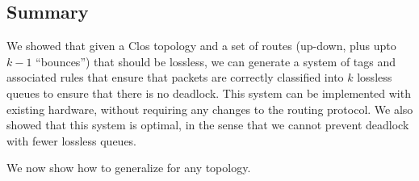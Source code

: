 \subsection {Summary}

We showed that given a Clos topology and a set of routes (up-down, plus
upto $k-1$ ``bounces'') that should be lossless, we can generate a system of
tags and associated rules that ensure that packets are correctly classified
into $k$ lossless queues to ensure that there is no deadlock.   This system can
be implemented with existing hardware, without requiring any changes to the
routing protocol. We also showed that this system is optimal, in the sense that
we cannot prevent deadlock with fewer lossless queues.

We now show how to generalize \sysname{} for any topology.
